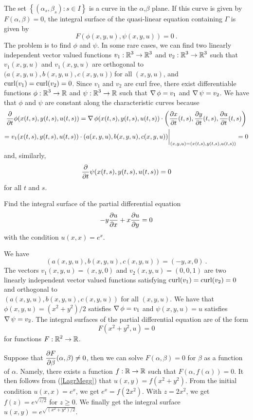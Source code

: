 The set $\displaystyle \left\{ (\alpha_s,\beta_s) : s \in I \right\}$
is a curve in the $\alpha$,$\beta$ plane.  If this curve is given by
$F(\alpha,\beta)=0$, the integral surface of the quasi-linear equation
containing $\Gamma$ is given by
\[
F(\phi(x,y,u), \psi(x,y,u)) = 0 \ .
\]
The problem is to find $\phi$ and $\psi$.  In some rare cases, we can
find two linearly independent vector valued functions
$\displaystyle v_1:\RR^3\rightarrow \RR^3$ and
$\displaystyle v_2:\RR^3\rightarrow \RR^3$ such that
$v_1(x,y,u)$ and $v_1(x,y,u)$ are orthogonal to
$\big(a(x,y,u),b(x,y,u),c(x,y,u)\big)$ for all $(x,y,u)$, and
$\curL(v_1) = \curL(v_2)=0$.  Since $v_1$ and $v_2$ are curl free,
there exist differentiable functions
$\displaystyle \phi:\RR^3\rightarrow \RR$ and
$\displaystyle \psi:\RR^3\rightarrow \RR$ such that $\graD \phi = v_1$ and
$\graD \psi = v_2$.  We have that $\phi$ and $\psi$ are constant along
the characteristic curves because
\begin{multline*}
\pdfdx{ \phi(x(t,s),y(t,s),u(t,s)) }{t}
= \graD \phi(x(t,s),y(t,s),u(t,s)) \cdot \left(\pdydx{x}{t}(t,s),
\pdydx{y}{t}(t,s), \pdydx{u}{t}(t,s) \right) \\
= v_1(x(t,s),y(t,s),u(t,s)) \cdot
(a(x,y,u),b(x,y,u),c(x,y,u))\bigg|_{(x,y,u)=(x(t,s),y(t,s),u(t,s))} = 0
\end{multline*}
and, similarly,
\[
\pdfdx{ \psi(x(t,s),y(t,s),u(t,s)) }{t} = 0
\]
for all $t$ and $s$.

\begin{egg}
Find the integral surface of the partial differential equation
\[
-y \pdydx{u}{x} + x \pdydx{u}{y} = 0
\]
with the condition $\displaystyle u(x,x)=e^x$.

We have
\[
\left(a(x,y,u),b(x,y,u),c(x,y,u)\right) = (-y,x,0) \ .
\]
The vectors $v_1(x,y,u)=(x,y,0)$ and $v_2(x,y,u)=(0,0,1)$ are two
linearly independent vector valued functions satisfying
$\curL(v_1) = \curL(v_2) = 0$ and orthogonal to\\
$(a(x,y,u),b(x,y,u),c(x,y,u))$ for all $(x,y,u)$.
We have that $\displaystyle \phi(x,y,u)=(x^2+y^2)/2$
satisfies $\graD \phi = v_1$ and $\psi(x,y,u)=u$ satisfies
$\graD \psi = v_2$.  The integral surfaces of the partial differential
equation are of the form
\begin{equation} \label{LagrMegg}
F(x^2+y^2, u) = 0
\end{equation}
for functions $\displaystyle F:\RR^2 \rightarrow \RR$.  

Suppose that $\displaystyle \pdydx{F}{\beta}(\alpha,\beta) \neq 0$,
then we can solve $F(\alpha,\beta)=0$ for $\beta$ as a function of
$\alpha$.  Namely, there exists a function $f:\RR\rightarrow \RR$
such that $F(\alpha,f(\alpha))=0$.  It then follows from (\ref{LagrMegg})
that $\displaystyle u(x,y) =f(x^2+y^2)$.  From the initial condition
$\displaystyle u(x,x)= e^x$, we
get $\displaystyle e^x = f(2x^2)$.  With $\displaystyle z = 2x^2$, we get
$\displaystyle f(z) = e^{\sqrt{z/2}}$ for $z \geq 0$. 
We finally get the integral surface
$\displaystyle u(x,y) = e^{\sqrt{(x^2+y^2)/2}}$.
\end{egg}

